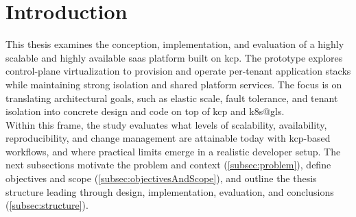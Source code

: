 \documentclass[11pt, a4paper, oneside, listof=totoc]{scrartcl}
\begin{document}
    \clearpage

    \printglossary[type=\acronymtype, title={Acronyms}]
    \cleardoublepage
    \printglossary[title={Glossary}]


    \cleardoublepage

    \begingroup
        \tableofcontents
    \endgroup

    \newpage

    \cleardoublepage
    \begingroup
        \renewcommand{\addcontentsline}[3]{}
        \listoffigures
    \endgroup

    \cleardoublepage
    \begingroup
        \renewcommand{\addcontentsline}[3]{}
        \listoftables
    \endgroup

    \newpage


    \section{Introduction}\label{sec:introduction}
        This thesis examines the conception, implementation, and evaluation of a highly scalable and
        highly available \gls{saas} platform built on \gls{kcp}.
        The prototype explores control-plane virtualization to provision and operate per-tenant
        application stacks while maintaining strong isolation and shared platform services.
        The focus is on translating architectural goals, such as elastic scale, fault tolerance, and
        tenant isolation into concrete design and code on top of \gls{kcp} and \gls{k8s@gls}.\\
        Within this frame, the study evaluates what levels of scalability, availability,
        reproducibility, and change management are attainable today with \gls{kcp}-based workflows,
        and where practical limits emerge in a realistic developer setup.
        The next subsections motivate the problem and context (\autoref{subsec:problem}), define
        objectives and scope (\autoref{subsec:objectivesAndScope}), and outline the thesis structure leading
        through design, implementation, evaluation, and conclusions (\autoref{subsec:structure}).
\end{document}
